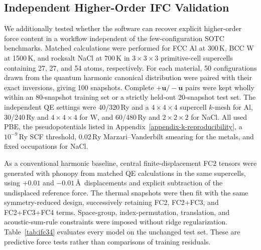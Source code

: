 \documentclass[aps,prb,reprint,amsmath,amssymb,floatfix]{revtex4-2}
\begin{document}
\subsection{Independent Higher-Order IFC
Validation}\label{independent-higher-order-ifc-validation}

We additionally tested whether the software can recover explicit higher-order
force content in a workflow independent of the few-configuration SOTC
benchmarks.  Matched calculations were performed for FCC Al at 300\,K, BCC W
at 1500\,K, and rocksalt NaCl at 700\,K in \(3\times3\times3\)
primitive-cell supercells containing 27, 27, and 54 atoms, respectively.
For each material, 50 configurations drawn from the quantum harmonic canonical
distribution were paired with their exact inversions, giving 100 snapshots.
Complete \(+\mathbf u/-\mathbf u\) pairs were kept wholly within an
80-snapshot training set or a strictly held-out 20-snapshot test set.
The independent QE settings were 40/320\,Ry and a \(4\times4\times4\)
supercell \(k\)-mesh for Al, 30/240\,Ry and \(4\times4\times4\) for W,
and 60/480\,Ry and \(2\times2\times2\) for NaCl. All used PBE, the
pseudopotentials listed in Appendix~\ref{appendix-k-reproducibility}, a
\(10^{-9}\)\,Ry SCF threshold, 0.02\,Ry Marzari--Vanderbilt smearing for
the metals, and fixed occupations for NaCl.

As a conventional harmonic baseline, central finite-displacement FC2 tensors
were generated with phonopy from matched QE calculations in the same
supercells, using \(+\!0.01\) and \(-\!0.01\)\,\AA\ displacements and
explicit subtraction of the undisplaced reference force.  The thermal
snapshots were then fit with the same symmetry-reduced design,
successively retaining FC2, FC2+FC3, and FC2+FC3+FC4 terms.  Space-group,
index-permutation, translation, and acoustic-sum-rule constraints were imposed
without ridge regularization.  Table~\ref{tab:ifc34} evaluates every model on
the unchanged test set.  These are predictive force tests rather than
comparisons of training residuals.
\end{document}
